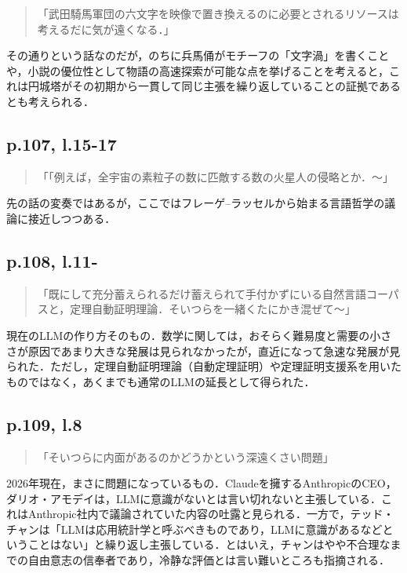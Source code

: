 \documentclass[10pt, a5paper, twoside]{ltjsarticle}
\newcommand{\hyphen}{\insertkanjiskip--\insertkanjiskip}
\begin{document}
            \begin{quote}
                「武田騎馬軍団の六文字を映像で置き換えるのに必要とされるリソースは考えるだに気が遠くなる．」
            \end{quote}

            その通りという話なのだが，のちに兵馬俑がモチーフの「文字渦」を書くことや，小説の優位性として物語の高速探索が可能な点を挙げること\cite{kakuyomu}を考えると，これは円城塔がその初期から一貫して同じ主張を繰り返していることの証拠であるとも考えられる．

        \subsection{p.107, l.15-17}

            \begin{quote}
                「「例えば，全宇宙の素粒子の数に匹敵する数の火星人の侵略とか．〜」
            \end{quote}

            先の話の変奏ではあるが，ここではフレーゲ\hyphen ラッセルから始まる言語哲学の議論に接近しつつある．

        \subsection{p.108, l.11-}

            \begin{quote}
                「既にして充分蓄えられるだけ蓄えられて手付かずにいる自然言語コーパスと，定理自動証明理論．そいつらを一緒くたにかき混ぜて〜」
            \end{quote}

            現在のLLMの作り方そのもの．数学に関しては，おそらく難易度と需要の小ささが原因であまり大きな発展は見られなかったが，直近になって急速な発展が見られた．ただし，定理自動証明理論（自動定理証明）や定理証明支援系を用いたものではなく，あくまでも通常のLLMの延長として得られた．

        \subsection{p.109, l.8}

            \begin{quote}
                「そいつらに内面があるのかどうかという深遠くさい問題」
            \end{quote}

            2026年現在，まさに問題になっているもの．Claudeを擁するAnthropicのCEO，ダリオ・アモデイは，LLMに意識がないとは言い切れないと主張している\cite{amodei1}．これはAnthropic社内で議論されていた内容\cite{amodei2,amodei3,constitution}の吐露と見られる．一方で，テッド・チャンは「LLMは応用統計学と呼ぶべきものであり，LLMに意識があるなどということはない」と繰り返し主張している\cite{chiang1, chiang2}．とはいえ，チャンはやや不合理なまでの自由意志の信奉者であり，冷静な評価とは言い難いところも指摘される．
\end{document}

